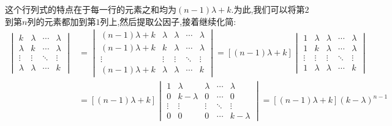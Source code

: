 \documentclass{ctexart}
\begin{document}
\begin{solution}
    这个行列式的特点在于每一行的元素之和均为$(n-1)\lambda+k$.为此,我们可以将第$2$到第$n$列的元素都加到第$1$列上,然后提取公因子,接着继续化简:
    \[\begin{aligned}
        \begin{vmatrix}
            k&\lambda&\cdots&\lambda\\
            \lambda&k&\cdots&\lambda\\
            \vdots&\vdots&\ddots&\vdots\\
            \lambda&\lambda&\cdots&k
        \end{vmatrix}
        &= \begin{vmatrix}
            (n-1)\lambda+k&\lambda&\lambda&\cdots&\lambda\\
            (n-1)\lambda+k&k&\lambda&\cdots&\lambda\\
            \vdots&\vdots&\vdots&\ddots&\vdots\\
            (n-1)\lambda+k&\lambda&\lambda&\cdots&k
        \end{vmatrix}=\left[(n-1)\lambda+k\right]\begin{vmatrix}
            1&\lambda&\lambda&\cdots&\lambda\\
            1&k&\lambda&\cdots&\lambda\\
            \vdots&\vdots&\vdots&\ddots&\vdots\\
            1&\lambda&\lambda&\cdots&k
        \end{vmatrix} \\
        &= \left[(n-1)\lambda+k\right]\begin{vmatrix}
            1&\lambda&\lambda&\cdots&\lambda\\
            0&k-\lambda&0&\cdots&0\\
            \vdots&\vdots&\vdots&\ddots&\vdots\\
            0&0&0&\cdots&k-\lambda
        \end{vmatrix}=\left[(n-1)\lambda+k\right](k-\lambda)^{n-1}
    \end{aligned}\]
\end{solution}
\end{document}
